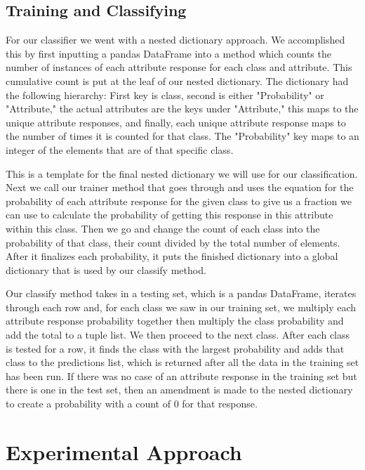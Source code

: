 \documentclass[twoside,11pt]{article}
\begin{document}
	\subsection{Training and Classifying}\label{subsec:training-and-classifying}
	For our classifier we went with a nested dictionary approach. We accomplished this by first inputting a pandas DataFrame into a method which counts the number of instances of each attribute response for each class and attribute. This cumulative count is put at the leaf of our nested dictionary. The dictionary had the following hierarchy: First key is class, second is either "Probability" or "Attribute," the actual attributes are the keys under "Attribute," this maps to the unique attribute responses, and finally, each unique attribute response maps to the number of times it is counted for that class. The "Probability" key maps to an integer of the elements that are of that specific class.
	
	This is a template for the final nested dictionary we will use for our classification. Next we call our trainer method that goes through and uses the equation for the probability of each attribute response for the given class to give us a fraction we can use to calculate the probability of getting this response in this attribute within this class. Then we go and change the count of each class into the probability of that class, their count divided by the total number of elements. After it finalizes each probability, it puts the finished dictionary into a global dictionary that is used by our classify method.
	
	Our classify method takes in a testing set, which is a pandas DataFrame, iterates through each row and, for each class we saw in our training set, we multiply each attribute response probability together then multiply the class probability and add the total to a tuple list. We then proceed to the next class. After each class is tested for a row, it finds the class with the largest probability and adds that class to the predictions list, which is returned after all the data in the training set has been run. If there was no case of an attribute response in the training set but there is one in the test set, then an amendment is made to the nested dictionary to create a probability with a count of 0 for that response.

	\section{Experimental Approach}\label{sec:experimental-approach}
	
\end{document}
